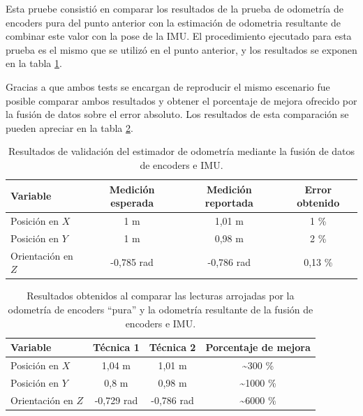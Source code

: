 Esta pruebe consistió en comparar los resultados de la prueba de odometría de encoders pura del punto anterior con la estimación de odometria resultante de combinar este valor con la pose de la IMU. El procedimiento ejecutado para esta prueba es el mismo que se utilizó en el punto anterior, y los resultados se exponen en la tabla \ref{tab:odometriaFusion}.

Gracias a que ambos tests se encargan de reproducir el mismo escenario fue posible comparar ambos resultados y obtener el porcentaje de mejora ofrecido por la fusión de datos sobre el error absoluto. Los resultados de esta comparación se pueden apreciar en la tabla \ref{tab:comparacionOdom}.

\begin{table}
    \centering
    \caption[Fusión de odometría con IMU]{Resultados de validación del estimador de odometría mediante la fusión de datos de encoders e IMU.}
    \begin{tabular}{lccc}
        \toprule
        \textbf{Variable}  & \textbf{Medición esperada} & \textbf{Medición reportada} & \textbf{Error obtenido} \\
        \midrule
        Posición en $X$    & 1 m                        & 1,01 m                      & 1 \%                    \\
        Posición en $Y$    & 1 m                        & 0,98 m                      & 2 \%                    \\
        Orientación en $Z$ & -0,785 rad                 & -0,786 rad                  & 0,13 \%                 \\
        \bottomrule
        \hline
    \end{tabular}
    \label{tab:odometriaFusion}
\end{table}

\begin{table}
    \centering
    \caption[Comparacion de calculos de odometría]{Resultados obtenidos al comparar las lecturas arrojadas por la odometría de encoders ``pura'' y la odometría resultante de la fusión de encoders e IMU.}
    \begin{tabular}{lccc}
        \toprule
        \textbf{Variable}  & \textbf{Técnica 1} & \textbf{Técnica 2} & \textbf{Porcentaje de mejora} \\
        \midrule
        Posición en $X$    & 1,04 m             & 1,01 m             & \textasciitilde300 \%                        \\
        Posición en $Y$    & 0,8 m              & 0,98 m             & \textasciitilde1000 \%                       \\
        Orientación en $Z$ & -0,729 rad         & -0,786 rad         & \textasciitilde6000 \%        \\
        \bottomrule
    \end{tabular}
    \label{tab:comparacionOdom}
\end{table}


